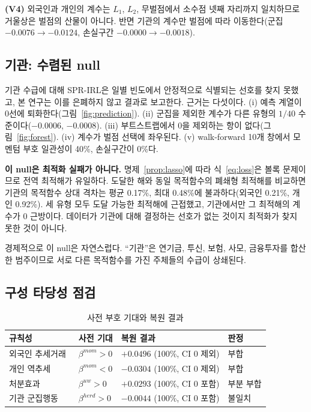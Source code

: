 \textbf{(V4)} 외국인과 개인의 계수는 $L_1$, $L_2$, 무벌점에서 소수점 넷째 자리까지
일치하므로 거울상은 벌점의 산물이 아니다. 반면 기관의 계수만 벌점에 따라
이동한다(군집 $-0.0076\rightarrow-0.0124$, 손실구간
$-0.0000\rightarrow-0.0018$).

\subsection{기관: 수렴된 null}
\label{sec:null}

기관 수급에 대해 SPR-IRL은 일별 빈도에서 안정적으로 식별되는 선호를 찾지 못했고,
본 연구는 이를 은폐하지 않고 결과로 보고한다. 근거는 다섯이다. (i) 예측 계열이 0선에
퇴화한다(그림~\ref{fig:prediction}). (ii) 군집을 제외한 계수가 다른 유형의 $1/40$
수준이다($-0.0006$, $-0.0008$). (iii) 부트스트랩에서 0을 제외하는 항이
없다(그림~\ref{fig:forest}). (iv) 계수가 벌점 선택에 좌우된다. (v) walk-forward
10개 창에서 모멘텀 부호 일관성이 40\%, 손실구간이 0\%다.

\textbf{이 null은 최적화 실패가 아니다.} 명제~\ref{prop:lasso}에 따라
식~\eqref{eq:loss}은 볼록 문제이므로 전역 최적해가 유일하다. 도달한 해와 동일
목적함수의 폐쇄형 최적해를 비교하면 기관의 목적함수 상대 격차는 평균 0.17\%, 최대
0.48\%에 불과하다(외국인 0.21\%, 개인 0.92\%). 세 유형 모두 도달 가능한 최적해에
근접했고, 기관에서만 그 최적해의 계수가 0 근방이다. 데이터가 기관에 대해 결정하는
선호가 없는 것이지 최적화가 찾지 못한 것이 아니다.

경제적으로 이 null은 자연스럽다. ``기관''은 연기금, 투신, 보험, 사모, 금융투자를
합산한 범주이므로 서로 다른 목적함수를 가진 주체들의 수급이 상쇄된다.

\subsection{구성 타당성 점검}
\label{sec:construct}

\begin{table}[t]
  \caption{사전 부호 기대와 복원 결과}
  \label{tab:construct}
  \small
  \begin{tabular}{@{}>{\raggedright\arraybackslash}p{}
                  >{\raggedright\arraybackslash}p{}
                  >{\raggedright\arraybackslash}p{}
                  >{\raggedright\arraybackslash}p{}@{}}
    \toprule
    규칙성 & 사전 기대 & 복원 결과 & 판정 \\
    \midrule
    외국인 추세거래~\cite{grinblatt2000investment,choe1999foreign}
      & $\beta^{mom}\!>\!0$ & $+0.0496$ (100\%, CI 0 제외) & 부합 \\
    개인 역추세~\cite{grinblatt2000investment,kaniel2008individual}
      & $\beta^{mom}\!<\!0$ & $-0.0304$ (100\%, CI 0 제외) & 부합 \\
    처분효과~\cite{shefrin1985disposition,odean1998investors}
      & $\beta^{uw}\!>\!0$ & $+0.0293$ (100\%, CI 0 포함) & 부분 부합 \\
    기관 군집행동~\cite{lakonishok1992impact}
      & $\beta^{herd}\!>\!0$ & $-0.0044$ (100\%, CI 0 포함) & 불일치 \\
    \bottomrule
  \end{tabular}
\end{table}

